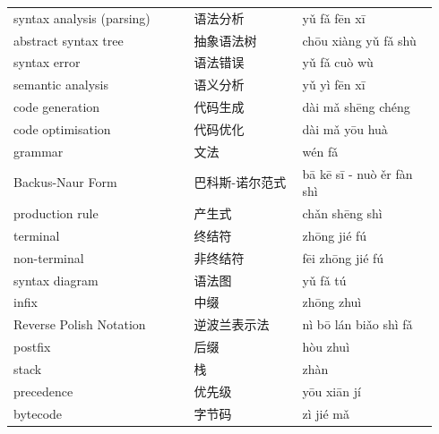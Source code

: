 \documentclass[11pt]{article}
\begin{document}
\begin{longtable}{@{}p{0.40\linewidth}p{0.24\linewidth}p{0.30\linewidth}@{}}
syntax analysis (parsing) & 语法分析 & yǔ fǎ fēn xī \\
abstract syntax tree & 抽象语法树 & chōu xiàng yǔ fǎ shù \\
syntax error & 语法错误 & yǔ fǎ cuò wù \\
semantic analysis & 语义分析 & yǔ yì fēn xī \\
code generation & 代码生成 & dài mǎ shēng chéng \\
code optimisation & 代码优化 & dài mǎ yōu huà \\
grammar & 文法 & wén fǎ \\
Backus-Naur Form & 巴科斯-诺尔范式 & bā kē sī - nuò ěr fàn shì \\
production rule & 产生式 & chǎn shēng shì \\
terminal & 终结符 & zhōng jié fú \\
non-terminal & 非终结符 & fēi zhōng jié fú \\
syntax diagram & 语法图 & yǔ fǎ tú \\
infix & 中缀 & zhōng zhuì \\
Reverse Polish Notation & 逆波兰表示法 & nì bō lán biǎo shì fǎ \\
postfix & 后缀 & hòu zhuì \\
stack & 栈 & zhàn \\
precedence & 优先级 & yōu xiān jí \\
bytecode & 字节码 & zì jié mǎ \\
\end{longtable}
\end{document}

